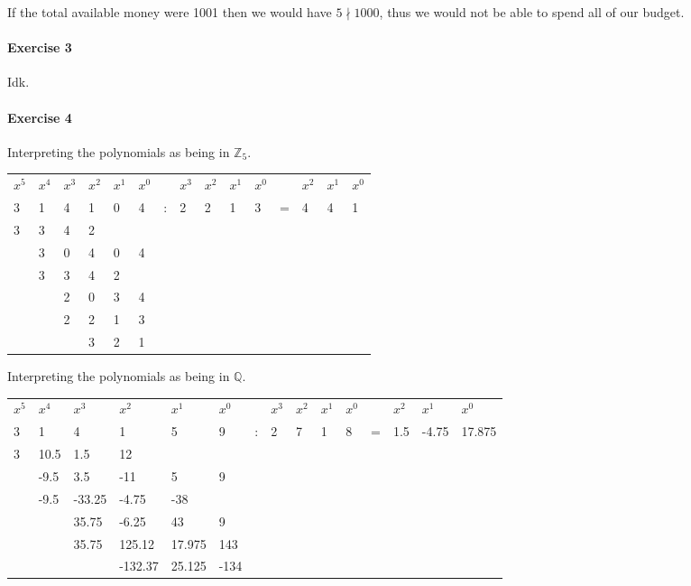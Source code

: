 \documentclass{article}
\begin{document}
If the total available money were 1001 then we would have $5 \nmid 1000$, thus we would not be able to spend all of our budget.

\pagebreak
\paragraph{Exercise 3}

Idk.

\pagebreak
\paragraph{Exercise 4}

Interpreting the polynomials as being in $\mathbb{Z}_5$.
\begin{center}
    \begin{tabular}{l l l l l l l l l l l l l l l}
        $x^5$&$x^4$&$x^3$&$x^2$&$x^1$&$x^0$&&$x^3$&$x^2$&$x^1$&$x^0$&&$x^2$&$x^1$&$x^0$ \\
        3&1&4&1&0&4 &:& 2&2&1&3 &=& 4&4&1 \\
        3&3&4&2&&&&&&&&&&& \\\cmidrule{1-4}
        &3&0&4&0&4&&&&&&&&& \\
        &3&3&4&2&&&&&&&&&& \\\cmidrule{2-5}
        &&2&0&3&4&&&&&&& \\
        &&2&2&1&3&&&&&&& \\\cmidrule{3-6}
        &&&3&2&1&&&&&&& \\
    \end{tabular}
\end{center}

Interpreting the polynomials as being in $\mathbb{Q}$.

\begin{center}
    \begin{tabular}{l l l l l l l l l l l l l l l}
        $x^5$&$x^4$&$x^3$&$x^2$&$x^1$&$x^0$&&$x^3$&$x^2$&$x^1$&$x^0$&&$x^2$&$x^1$&$x^0$ \\
        3&1&4&1&5&9 &:& 2&7&1&8 &=& 1.5&-4.75&17.875 \\
        3&10.5&1.5&12&&&&&&&&&&& \\\cmidrule{1-4}
        &-9.5&3.5&-11&5&9&&&&&&&&& \\
        &-9.5&-33.25&-4.75&-38&&&&&&&&&& \\\cmidrule{2-5}
        &&35.75&-6.25&43&9&&&&&&& \\
        &&35.75&125.12&17.975&143&&&&&&& \\\cmidrule{3-6}
        &&&-132.37&25.125&-134&&&&&&& \\
    \end{tabular}
\end{center}
\end{document}
